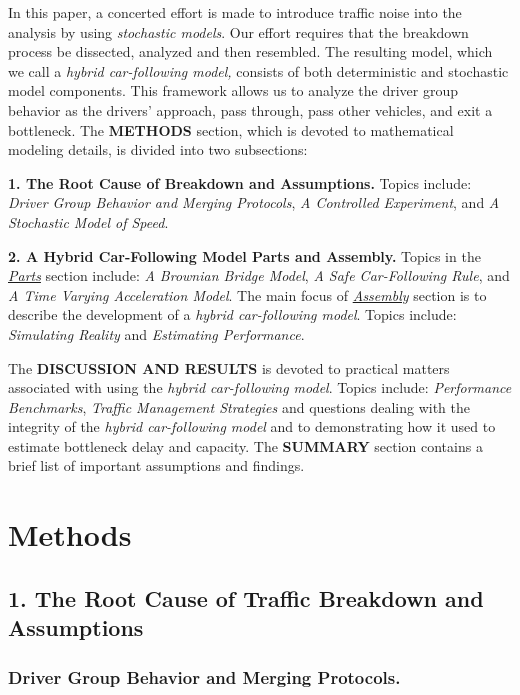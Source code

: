 \documentclass[Proceedings]{ascelike}
\begin{document}
In this paper, a concerted effort is made to introduce traffic noise into the analysis by using \emph{stochastic models}. Our effort requires that the breakdown process be dissected, analyzed and then resembled. The resulting model, which we call a \emph{hybrid car-following model,} consists of both deterministic and stochastic model components. This framework allows us to analyze the driver group behavior as the drivers' approach, pass through, pass other vehicles, and exit a bottleneck. The  \textbf{METHODS} section, which is devoted to mathematical modeling details,  is divided into two subsections:
\begin{description}
    \item \textbf{1. The Root Cause of Breakdown and Assumptions.} Topics include:  \emph{Driver Group Behavior and Merging Protocols}, \emph{A Controlled Experiment}, and \emph{A Stochastic Model of Speed}. 
    \item \textbf{2. A Hybrid Car-Following Model Parts and Assembly.} Topics in the \underline{\emph{Parts}} section include: \emph{A Brownian Bridge Model}, \emph{A Safe Car-Following Rule}, and \emph{A Time Varying Acceleration Model}. The main focus of \underline{\emph{Assembly}} section is  to describe  the development of a \emph{hybrid car-following model}.  Topics include: \emph{Simulating Reality} and \emph{Estimating Performance}.
\end{description}
The \textbf{DISCUSSION AND RESULTS} is devoted to practical matters associated with using the \emph{hybrid car-following model}. Topics include: \emph{Performance Benchmarks}, \emph{Traffic Management Strategies} and questions dealing with the integrity of the \emph{hybrid car-following model} and to demonstrating how  it used to estimate bottleneck delay and capacity. The \textbf{SUMMARY} section contains a brief list of  important assumptions and findings.





\section{Methods}

\subsection{1. The Root Cause of Traffic Breakdown and Assumptions} 

\subsubsection{Driver Group Behavior and Merging Protocols.} 
\end{document}
